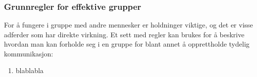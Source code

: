 \subsubsection{Grunnregler for effektive grupper}

For å fungere i gruppe med andre mennesker er holdninger viktige, og det er visse adferder som har direkte virkning. Et sett med regler kan brukes for å beskrive hvordan man kan forholde seg i en gruppe for blant annet å opprettholde tydelig kommunikasjon:

\begin{enumerate}
	\item blablabla
\end{enumerate}